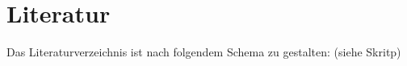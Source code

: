 \documentclass[11pt,captions=tableheading]{scrartcl}
\begin{document}

\setcounter{page}{1}
\tableofcontents
\setcounter{tocdepth}{3}
\clearscrheadfoot
\pagestyle{scrheadings}
\cfoot[]{} 
\ofoot[\pagemark]{\pagemark}
\newpage
{}
\setcounter{page}{1}
%







%
%

\section{Literatur}
Das Literaturverzeichnis ist nach folgendem Schema zu gestalten: (siehe Skritp)\\



\end{document}
